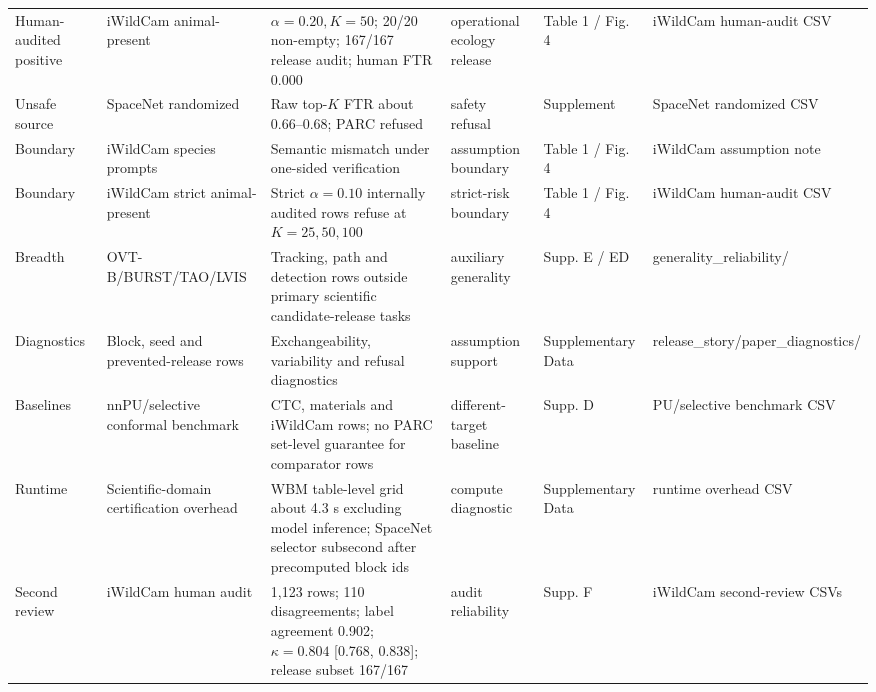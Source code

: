 \documentclass[11pt]{article}
\begin{document}
\begin{table}[h]
{\begin{tabular}{llllll}
Human-audited positive & iWildCam animal-present & \(\alpha=0.20,K=50\); 20/20 non-empty; 167/167 release audit; human FTR 0.000 & operational ecology release & Table 1 / Fig. 4 & iWildCam human-audit CSV \\
Unsafe source & SpaceNet randomized & Raw top-\(K\) FTR about 0.66--0.68; PARC refused & safety refusal & Supplement & SpaceNet randomized CSV \\
Boundary & iWildCam species prompts & Semantic mismatch under one-sided verification & assumption boundary & Table 1 / Fig. 4 & iWildCam assumption note \\
Boundary & iWildCam strict animal-present & Strict \(\alpha=0.10\) internally audited rows refuse at \(K=25,50,100\) & strict-risk boundary & Table 1 / Fig. 4 & iWildCam human-audit CSV \\
Breadth & OVT-B/BURST/TAO/LVIS & Tracking, path and detection rows outside primary scientific candidate-release tasks & auxiliary generality & Supp. E / ED & generality\_reliability/ \\
Diagnostics & Block, seed and prevented-release rows & Exchangeability, variability and refusal diagnostics & assumption support & Supplementary Data & release\_story/paper\_diagnostics/ \\
Baselines & nnPU/selective conformal benchmark & CTC, materials and iWildCam rows; no PARC set-level guarantee for comparator rows & different-target baseline & Supp. D & PU/selective benchmark CSV \\
Runtime & Scientific-domain certification overhead & WBM table-level grid about 4.3 s excluding model inference; SpaceNet selector subsecond after precomputed block ids & compute diagnostic & Supplementary Data & runtime overhead CSV \\
Second review & iWildCam human audit & 1,123 rows; 110 disagreements; label agreement 0.902; \(\kappa=0.804\) [0.768, 0.838]; release subset 167/167 & audit reliability & Supp. F & iWildCam second-review CSVs \\
\bottomrule
\end{tabular}}
\end{table}
\end{document}
